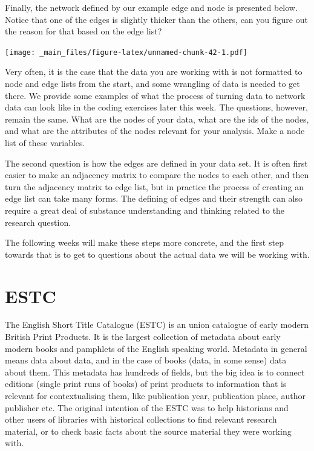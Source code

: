 \documentclass[
]{book}
\begin{document}
Finally, the network defined by our example edge and node is presented below. Notice that one of the
edges is slightly thicker than the others, can you figure out the reason for that based on the edge list?

\texttt{[image: \_main\_files/figure-latex/unnamed-chunk-42-1.pdf]}

Very often, it is the case that the data you are working with is not formatted to node and edge lists from the start, and some wrangling of data is needed to get there. We provide some examples of what the process of turning data to network data can look like in the coding exercises later this week. The questions, however, remain the same. What are the nodes of your data, what are the ids of the nodes, and what are the attributes of the nodes relevant for your analysis. Make a node list of these variables.

The second question is how the edges are defined in your data set. It is often first easier to make an adjacency matrix to compare the nodes to each other, and then turn the adjacency matrix to edge list, but in practice the process of creating an edge list can take many forms. The defining of edges and their strength can also require a great deal of substance understanding and thinking related to the research question.

The following weeks will make these steps more concrete, and the first step towards that is to get to questions about the actual data we will be working with.

\hypertarget{estc}{%
\section{ESTC}\label{estc}}

The English Short Title Catalogue (ESTC) is an union catalogue of early modern British Print Products. It is the largest collection of metadata about early modern books and pamphlets of the English speaking world. Metadata in general means data about data, and in the case of books (data, in some sense) data about them. This metadata has hundreds of fields, but the big idea is to connect editions (single print runs of books) of print products to information that is relevant for contextualising them, like publication year, publication place, author publisher etc. The original intention of the ESTC was to help historians and other users of libraries with historical collections to find relevant research material, or to check basic facts about the source material they were working with.
\end{document}
